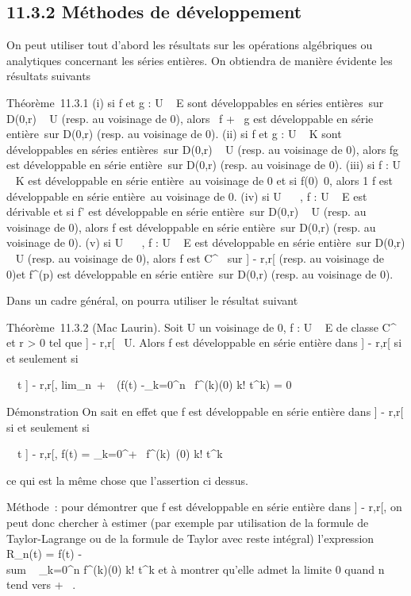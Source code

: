 \documentclass[]{article}
\begin{document}
\subsection{11.3.2 Méthodes de développement}

On peut utiliser tout d'abord les résultats sur les opérations
algébriques ou analytiques concernant les séries entières. On obtiendra
de manière évidente les résultats suivants

Théorème~11.3.1 (i) si f et g : U \rightarrow~ E sont développables en séries
entières~sur D(0,r) \subset~ U (resp. au voisinage de 0), alors \alpha~f + \beta~g est
développable en série entière~sur D(0,r) (resp. au voisinage de 0). (ii)
si f et g : U \rightarrow~ K sont développables en séries entières~sur D(0,r) \subset~ U
(resp. au voisinage de 0), alors fg est développable en série
entière~sur D(0,r) (resp. au voisinage de 0). (iii) si f : U \rightarrow~ K est
développable en série entière~au voisinage de 0 et si
f(0)\neq~0, alors  1 \over f
est développable en série entière~au voisinage de 0. (iv) si U \subset~ ~, f :
U \rightarrow~ E est dérivable et si f' est développable en série entière~sur
D(0,r) \subset~ U (resp. au voisinage de 0), alors f est développable en série
entière~sur D(0,r) (resp. au voisinage de 0). (v) si U \subset~ ~, f : U \rightarrow~ E
est développable en série entière~sur D(0,r) \subset~ U (resp. au voisinage de
0), alors f est C^\infty~ sur ] - r,r[ (resp. au voisinage de
0)et f^(p) est développable en série entière~sur D(0,r)
(resp. au voisinage de 0).

Dans un cadre général, on pourra utiliser le résultat suivant

Théorème~11.3.2 (Mac Laurin). Soit U un voisinage de 0, f : U \rightarrow~ E de
classe C^\infty~ et r > 0 tel que ] - r,r[\subset~ U.
Alors f est développable en série entière dans ] - r,r[ si et
seulement si

\forall~~t \in] - r,r[,
lim_n\rightarrow~+\infty~~\left (f(t)
-\sum _k=0^n~
f^(k)(0) \over k!
t^k\right ) = 0

Démonstration On sait en effet que f est développable en série entière
dans ] - r,r[ si et seulement si

\forall~~t \in] - r,r[, f(t) =
\sum _k=0^+\infty~ f^(k)~(0)
\over k! t^k

ce qui est la même chose que l'assertion ci dessus.

Méthode~: pour démontrer que f est développable en série entière dans
] - r,r[, on peut donc chercher à estimer (par exemple par
utilisation de la formule de Taylor-Lagrange ou de la formule de Taylor
avec reste intégral) l'expression R_n(t) = f(t)
-\\sum ~
_k=0^n f^(k)(0) \over k!
t^k et à montrer qu'elle admet la limite 0 quand n tend vers
+ \infty~.
\end{document}
